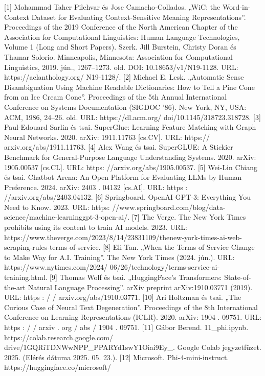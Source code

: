\documentclass[12pt]{report}
\theoremstyle{definition}
\begin{document}
[1] Mohammad Taher Pilehvar és Jose Camacho-Collados. „WiC: the Word-in-Context
Dataset for Evaluating Context-Sensitive Meaning Representations”. Proceedings
of the 2019 Conference of the North American Chapter of the Association for
Computational Linguistics: Human Language Technologies, Volume 1 (Long and
Short Papers). Szerk. Jill Burstein, Christy Doran és Thamar Solorio. Minneapolis,
Minnesota: Association for Computational Linguistics, 2019. jún., 1267–1273. old.
DOI: 10.18653/v1/N19-1128. URL: https://aclanthology.org/
N19-1128/.
[2] Michael E. Lesk. „Automatic Sense Disambiguation Using Machine Readable Dictionaries: How to Tell a Pine Cone from an Ice Cream Cone”. Proceedings of the
5th Annual International Conference on Systems Documentation (SIGDOC ’86).
New York, NY, USA: ACM, 1986, 24–26. old. URL: https://dl.acm.org/
doi/10.1145/318723.318728.
[3] Paul-Edouard Sarlin és tsai. SuperGlue: Learning Feature Matching with Graph Neural Networks. 2020. arXiv: 1911.11763 [cs.CV]. URL: https://
arxiv.org/abs/1911.11763.
[4] Alex Wang és tsai. SuperGLUE: A Stickier Benchmark for General-Purpose Language Understanding Systems. 2020. arXiv: 1905.00537 [cs.CL]. URL: https:
//arxiv.org/abs/1905.00537.
[5] Wei-Lin Chiang és tsai. Chatbot Arena: An Open Platform for Evaluating LLMs
by Human Preference. 2024. arXiv: 2403 . 04132 [cs.AI]. URL: https :
//arxiv.org/abs/2403.04132.
[6] Springboard. OpenAI GPT-3: Everything You Need to Know. 2023. URL: https:
//www.springboard.com/blog/data-science/machine-learninggpt-3-open-ai/.
[7] The Verge. The New York Times prohibits using its content to train AI models. 2023.
URL: https://www.theverge.com/2023/8/14/23831109/thenew-york-times-ai-web-scraping-rules-terms-of-service.
[8] Eli Tan. „When the Terms of Service Change to Make Way for A.I. Training”. The
New York Times (2024. jún.). URL: https://www.nytimes.com/2024/
06/26/technology/terms-service-ai-training.html.
[9] Thomas Wolf és tsai. „HuggingFace’s Transformers: State-of-the-art Natural Language Processing”. arXiv preprint arXiv:1910.03771 (2019). URL: https : / /
arxiv.org/abs/1910.03771.
[10] Ari Holtzman és tsai. „The Curious Case of Neural Text Degeneration”. Proceedings of the 8th International Conference on Learning Representations (ICLR).
2020. arXiv: 1904 . 09751. URL: https : / / arxiv . org / abs / 1904 .
09751.
[11] Gábor Berend. 11\_phi.ipynb. https://colab.research.google.com/
drive/1GQRiTDNWwNPP\_PPARYd1swY1Oiai9Ey\_. Google Colab jegyzetfüzet. 2025. (Elérés dátuma 2025. 05. 23.).
[12] Microsoft. Phi-4-mini-instruct. https://huggingface.co/microsoft/
\end{document}
